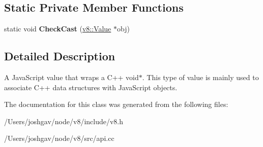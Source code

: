 \subsection*{Static Private Member Functions}
\begin{DoxyCompactItemize}
\item 
static void {\bfseries Check\+Cast} (\hyperlink{classv8_1_1_value}{v8\+::\+Value} $\ast$obj)\hypertarget{classv8_1_1_external_abec7c55373af2883de9300b606c0ba08}{}\label{classv8_1_1_external_abec7c55373af2883de9300b606c0ba08}

\end{DoxyCompactItemize}


\subsection{Detailed Description}
A Java\+Script value that wraps a C++ void$\ast$. This type of value is mainly used to associate C++ data structures with Java\+Script objects. 

The documentation for this class was generated from the following files\+:\begin{DoxyCompactItemize}
\item 
/\+Users/joshgav/node/v8/include/v8.\+h\item 
/\+Users/joshgav/node/v8/src/api.\+cc\end{DoxyCompactItemize}
